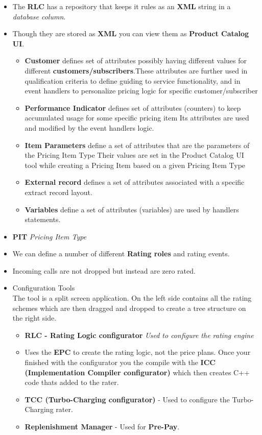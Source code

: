 \documentclass[12pt,twoside]{article}
\begin{document}
\begin{itemize}
\item The \textbf{RLC} has a repository that keeps it rules as an \textbf{XML} string
     in a \emph{database column}.
\item Though they are stored as \textbf{XML} you can view them as \textbf{Product Catalog UI}.
\begin{itemize}
\item \textbf{Customer} defines set of attributes possibly having different values for different \textbf{customers/subscribers}.These attributes are further used in qualification criteria to define guiding to service functionality, and in event handlers to personalize pricing logic for specific customer/subscriber
\item \textbf{Performance Indicator} defines set of attributes (counters) to keep accumulated usage for some specific pricing item Its attributes are used and modified by the event handlers logic.
\item \textbf{Item Parameters} define a set of attributes that are the parameters of the Pricing Item Type Their values are set in the Product Catalog UI tool while creating a Pricing Item based on a given Pricing Item Type
\item \textbf{External record} defines a set of attributes associated with a specific extract record layout.
\item \textbf{Variables} define a set of attributes (variables) are used by handlers statements.
\end{itemize}
\item \textbf{PIT} \emph{Pricing Item Type}
\item We can define a number of different \textbf{Rating roles} and rating events.
\item Incoming calls are not dropped but instead are zero rated.
\end{itemize}
\begin{itemize}

\item Configuration Tools\\
\label{sec-3-2-1-1}%
The tool is a split screen application. On the left side contains
    all the rating schemes which are then dragged and dropped to
    create a tree structure on the right side.

\begin{itemize}
\item \textbf{RLC - Rating Logic configurator} \emph{Used to configure the rating engine}
\item Uses the \textbf{EPC} to create the rating logic, not the price
       plans. Once your finished with the configurator you the compile
       with the \textbf{ICC (Implementation Compiler configurator)} which
       then creates C++ code thats added to the rater.
\item \textbf{TCC (Turbo-Charging configurator)} - Used to configure the
       Turbo-Charging rater.
\item \textbf{Replenishment Manager} - Used for \textbf{Pre-Pay}.
\end{itemize}
\end{itemize} %
\end{document}
